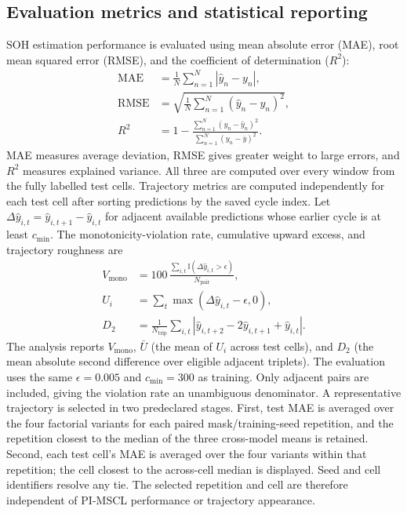 \documentclass[pdflatex,sn-mathphys-num]{sn-jnl}
\begin{document}
\subsection{Evaluation metrics and statistical reporting}
\label{subsec:evaluation_metrics}
\label{subsec:metrics}

SOH estimation performance is evaluated using mean absolute error (MAE), root mean squared error (RMSE), and the coefficient of determination ($R^2$):
\begin{align}
\mathrm{MAE} &= \frac{1}{N}\sum_{n=1}^{N}\left|\hat{y}_{n}-y_{n}\right|, \\
\mathrm{RMSE} &= \sqrt{\frac{1}{N}\sum_{n=1}^{N}\left(\hat{y}_{n}-y_{n}\right)^2}, \\
R^2 &= 1-\frac{\sum_{n=1}^{N}\left(y_n-\hat{y}_n\right)^2}{\sum_{n=1}^{N}\left(y_n-\bar{y}\right)^2}.
\end{align}
MAE measures average deviation, RMSE gives greater weight to large errors, and $R^2$ measures explained variance. All three are computed over every window from the fully labelled test cells. Trajectory metrics are computed independently for each test cell after sorting predictions by the saved cycle index. Let $\Delta\hat{y}_{i,t}=\hat{y}_{i,t+1}-\hat{y}_{i,t}$ for adjacent available predictions whose earlier cycle is at least $c_{\min}$. The monotonicity-violation rate, cumulative upward excess, and trajectory roughness are
\begin{align}
V_{\mathrm{mono}} &= 100\,\frac{\sum_{i,t}\mathbb{I}\!\left(\Delta\hat{y}_{i,t}>\epsilon\right)}{N_{\mathrm{pair}}},\\
U_i &= \sum_t \max\left(\Delta\hat{y}_{i,t}-\epsilon,0\right),\\
D_2 &= \frac{1}{N_{\mathrm{trip}}}\sum_{i,t}\left|\hat{y}_{i,t+2}-2\hat{y}_{i,t+1}+\hat{y}_{i,t}\right|.
\end{align}
The analysis reports $V_{\mathrm{mono}}$, $\bar{U}$ (the mean of $U_i$ across test cells), and $D_2$ (the mean absolute second difference over eligible adjacent triplets). The evaluation uses the same $\epsilon=0.005$ and $c_{\min}=300$ as training. Only adjacent pairs are included, giving the violation rate an unambiguous denominator. A representative trajectory is selected in two predeclared stages. First, test MAE is averaged over the four factorial variants for each paired mask/training-seed repetition, and the repetition closest to the median of the three cross-model means is retained. Second, each test cell's MAE is averaged over the four variants within that repetition; the cell closest to the across-cell median is displayed. Seed and cell identifiers resolve any tie. The selected repetition and cell are therefore independent of PI-MSCL performance or trajectory appearance.
\end{document}
